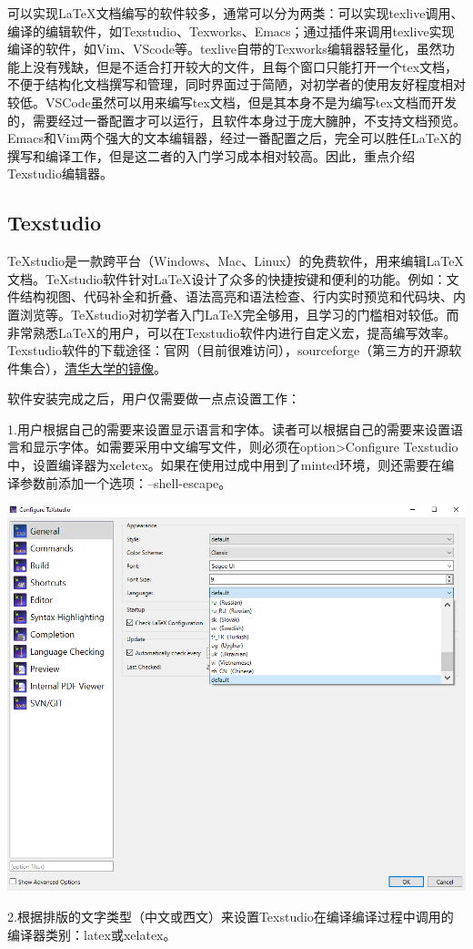 \documentclass[12pt]{book}
\begin{document}
可以实现\LaTeX{}文档编写的软件较多，通常可以分为两类：可以实现texlive调用、编译的编辑软件，如Texstudio、Texworks、Emacs；通过插件来调用texlive实现编译的软件，如Vim、VScode等。texlive自带的Texworks编辑器轻量化，虽然功能上没有残缺，但是不适合打开较大的文件，且每个窗口只能打开一个tex文档，不便于结构化文档撰写和管理，同时界面过于简陋，对初学者的使用友好程度相对较低。VSCode虽然可以用来编写tex文档，但是其本身不是为编写tex文档而开发的，需要经过一番配置才可以运行，且软件本身过于庞大臃肿，不支持文档预览。Emacs和Vim两个强大的文本编辑器，经过一番配置之后，完全可以胜任\LaTeX{}的撰写和编译工作，但是这二者的入门学习成本相对较高。因此，重点介绍Texstudio编辑器。

\subsection{Texstudio}
TeXstudio是一款跨平台（Windows、Mac、Linux）的免费软件，用来编辑\LaTeX{}文档。TeXstudio软件针对\LaTeX{}设计了众多的快捷按键和便利的功能。例如：文件结构视图、代码补全和折叠、语法高亮和语法检查、行内实时预览和代码块、内置浏览等。TeXstudio对初学者入门\LaTeX{}完全够用，且学习的门槛相对较低。而非常熟悉\LaTeX{}的用户，可以在Texstudio软件内进行自定义宏，提高编写效率。Texstudio软件的下载途径：官网（目前很难访问），sourceforge（第三方的开源软件集合），\href{https://mirrors.tuna.tsinghua.edu.cn/github-release/texstudio-org/texstudio/}{清华大学的镜像}。

软件安装完成之后，用户仅需要做一点点设置工作：

1.用户根据自己的需要来设置显示语言和字体。读者可以根据自己的需要来设置语言和显示字体。如需要采用中文编写文件，则必须在option>Configure Texstudio 中，设置编译器为xeletex。如果在使用过成中用到了minted环境，则还需要在编译参数前添加一个选项：--shell-escape。

\begin{center}
	\includegraphics[scale=0.8]{./texstudio-lang.png}
\end{center}
2.根据排版的文字类型（中文或西文）来设置Texstudio在编译编译过程中调用的编译器类别：latex或xelatex。
\end{document}
